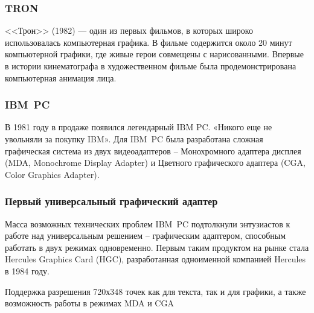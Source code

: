 \documentclass[10pt]{beamer}
\begin{document}
\begin{frame}\frametitle {TRON}
{
	{
		
	}
	{
		<<Трон>> (1982) — один из первых фильмов, в которых широко использовалась компьютерная графика. В фильме содержится около 20 минут компьютерной графики, где живые герои совмещены с нарисованными. Впервые в истории кинематографа в художественном фильме была продемонстрирована компьютерная анимация лица.
		
		\hfill
		
		\footnotesize{}
		\footnotesize{}
	}
	
	
	
}\end{frame}

\begin{frame}\frametitle{IBM~PC}{
	
	{
	}
	{
			В 1981 году в продаже появился легендарный IBM PC. «Никого еще не увольняли за покупку IBM».
			Для IBM~PC  была разработана сложная графическая система из двух видеоадаптеров – Монохромного адаптера дисплея (MDA, Monochrome Display Adapter) и Цветного графического адаптера (CGA, Color Graphics Adapter).
		
	}

}\end{frame}



\begin{frame}\frametitle{Первый универсальный графический адаптер}
{
	\small 
	
	Масса возможных технических проблем IBM~PC подтолкнули энтузиастов к работе над универсальным решением – графическим адаптером, способным работать в двух режимах одновременно. Первым таким продуктом на рынке стала Hercules Graphics Card (HGC), разработанная одноименной компанией Hercules в 1984 году.
	
	{
	}
	{
		Поддержка разрешения 720х348 точек как для текста, так и для графики, а также возможность работы в режимах MDA и CGA
	}
	
	
		
}\end{frame}
\end{document}
